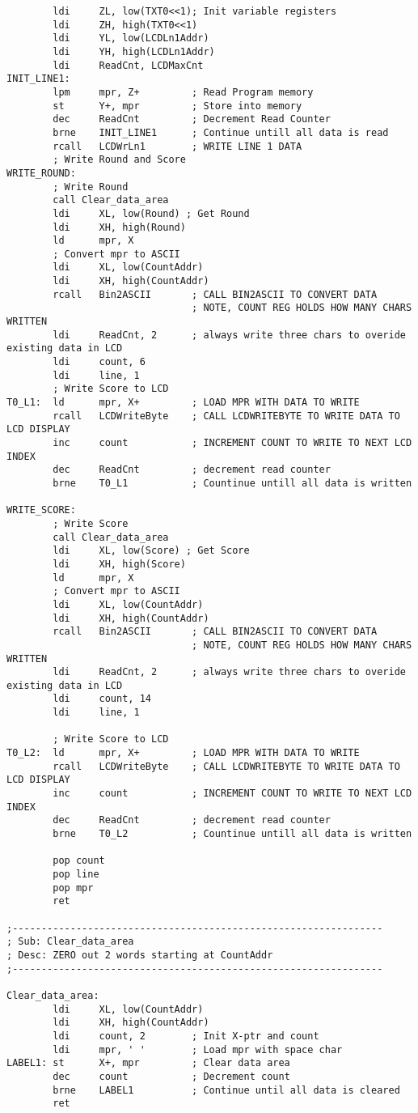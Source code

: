 \documentclass[10pt,letterpaper]{article}
\begin{document}
\begin{verbatim}
		ldi		ZL, low(TXT0<<1); Init variable registers
		ldi		ZH, high(TXT0<<1)
		ldi		YL, low(LCDLn1Addr)
		ldi		YH, high(LCDLn1Addr)
		ldi		ReadCnt, LCDMaxCnt
INIT_LINE1:
        lpm		mpr, Z+			; Read Program memory
        st		Y+, mpr			; Store into memory
        dec		ReadCnt			; Decrement Read Counter
        brne	INIT_LINE1		; Continue untill all data is read
        rcall	LCDWrLn1		; WRITE LINE 1 DATA
        ; Write Round and Score
WRITE_ROUND:
        ; Write Round
        call Clear_data_area
		ldi		XL, low(Round) ; Get Round
		ldi		XH, high(Round)
        ld      mpr, X
        ; Convert mpr to ASCII
		ldi		XL, low(CountAddr)
		ldi		XH, high(CountAddr)
		rcall	Bin2ASCII		; CALL BIN2ASCII TO CONVERT DATA
								; NOTE, COUNT REG HOLDS HOW MANY CHARS WRITTEN
		ldi		ReadCnt, 2		; always write three chars to overide existing data in LCD
        ldi     count, 6
        ldi     line, 1
        ; Write Score to LCD
T0_L1:	ld		mpr, X+			; LOAD MPR WITH DATA TO WRITE
		rcall	LCDWriteByte	; CALL LCDWRITEBYTE TO WRITE DATA TO LCD DISPLAY
		inc		count			; INCREMENT COUNT TO WRITE TO NEXT LCD INDEX
		dec		ReadCnt			; decrement read counter
		brne	T0_L1			; Countinue untill all data is written

WRITE_SCORE:
        ; Write Score
        call Clear_data_area
		ldi		XL, low(Score) ; Get Score
		ldi		XH, high(Score)
        ld      mpr, X
        ; Convert mpr to ASCII
		ldi		XL, low(CountAddr)
		ldi		XH, high(CountAddr)
		rcall	Bin2ASCII		; CALL BIN2ASCII TO CONVERT DATA
								; NOTE, COUNT REG HOLDS HOW MANY CHARS WRITTEN
		ldi		ReadCnt, 2		; always write three chars to overide existing data in LCD
        ldi     count, 14
        ldi     line, 1

        ; Write Score to LCD
T0_L2:	ld		mpr, X+			; LOAD MPR WITH DATA TO WRITE
		rcall	LCDWriteByte	; CALL LCDWRITEBYTE TO WRITE DATA TO LCD DISPLAY
		inc		count			; INCREMENT COUNT TO WRITE TO NEXT LCD INDEX
		dec		ReadCnt			; decrement read counter
		brne	T0_L2			; Countinue untill all data is written

        pop count
        pop line
        pop mpr
        ret

;----------------------------------------------------------------
; Sub: Clear_data_area
; Desc: ZERO out 2 words starting at CountAddr
;----------------------------------------------------------------

Clear_data_area:
		ldi		XL, low(CountAddr)
		ldi		XH, high(CountAddr)
		ldi		count, 2		; Init X-ptr and count
		ldi		mpr, ' '		; Load mpr with space char
LABEL1:	st		X+, mpr			; Clear data area
		dec		count			; Decrement count
		brne	LABEL1			; Continue until all data is cleared
        ret


\end{verbatim}
\end{document}
